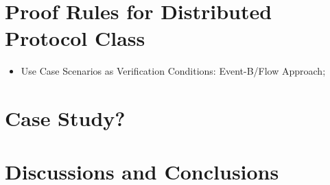 \documentclass{llncs}
\begin{document}
	\section{Proof Rules for Distributed Protocol Class}
	\begin{itemize}
		\item Use Case Scenarios as Verification Conditions: Event-B/Flow Approach; \cite{flow}
		
			
	\end{itemize}

	
	\section{Case Study?}
	\section{Discussions and Conclusions}
	
	
	
\end{document}
